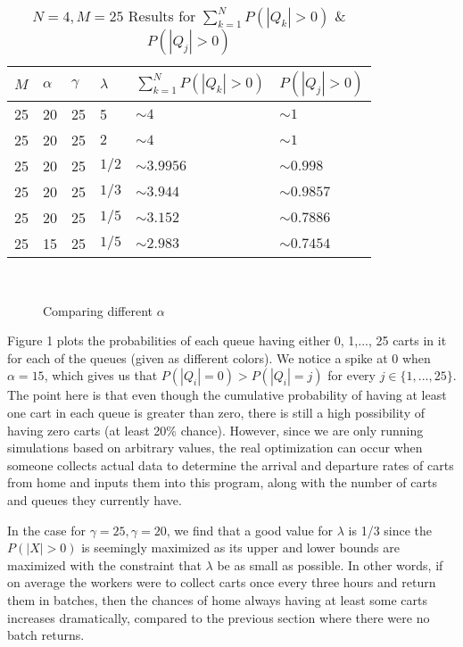 \documentclass[english]{article}
\begin{document}
\begin{table}[h!]
\begin{center}
	\begin{tabular}{| l | l | l | l | l | l |}
	\hline
	$M$ & $\alpha$ & $\gamma$ & $\lambda$ & $\sum_{k=1}^{N}P(|Q_k|>0)$ & $P(|Q_j|>0)$ \\ \hline
	25 & 20 & 25 & 5 & $\sim4$ & $\sim 1$ \\ \hline
	25 & 20 & 25 & $2$ & $\sim 4$ & $\sim 1$ \\ \hline
	25 & 20 & 25 & $1/2$ & $\sim 3.9956$ & $\sim 0.998$ \\ \hline
	25 & 20 & 25 & $1/3$ & $\sim3.944$ & $\sim 0.9857$ \\ \hline
	25 & 20 & 25 & $1/5$ & $\sim 3.152$ & $\sim0.7886$ \\ \hline
	25 & 15 & 25 & $1/5$ & $\sim 2.983$ & $\sim0.7454$ \\
	\hline
	\end{tabular}
\end{center}
\caption{$N = 4,M=25$ Results for $\sum_{k=1}^{N}P(|Q_k|>0)$ \& $P(|Q_j|>0)$ }
\end{table}

\begin{figure}[h!]
  \centering
    ~
  \caption{Comparing different $\alpha$}
\end{figure}
Figure 1 plots the probabilities of each queue having either 0, 1,..., 25 carts in it for each of the queues (given as different colors). We notice a spike at 0 when $\alpha=15$, which gives us that $P(|Q_i|=0)>P(|Q_i|=j)$ for every $j\in\{1,...,25\}$. The point here is that even though the cumulative probability of having at least one cart in each queue is greater than zero, there is still a high possibility of having zero carts (at least 20\% chance). However, since we are only running simulations based on arbitrary values, the real optimization can occur when someone collects actual data to determine the arrival and departure rates of carts from home and inputs them into this program, along with the number of carts and queues they currently have. 

In the case for $\gamma=25,\gamma=20$, we find that a good value for $\lambda$ is 1/3 since the $P(|X|>0)$ is seemingly maximized as its upper and lower bounds are maximized with the constraint that $\lambda$ be as small as possible. In other words, if on average the workers were to collect carts once every three hours and return them in batches, then the chances of home always having at least some carts increases dramatically, compared to the previous section where there were no batch returns. 
\end{document}
